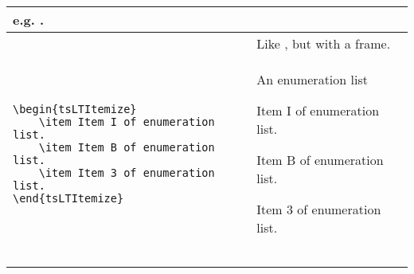 \begin{footnotesize}
\begin{longtable}{ | P{0.55\textwidth} | p{0.4\textwidth} | }
        e.g. .                                                                  \\
        \hline
         &
        Like , but with a frame.                                      \\
        \hline
        \begin{BVerbatim}
\begin{tsLTItemize}
    \item Item I of enumeration list.
    \item Item B of enumeration list.
    \item Item 3 of enumeration list.
\end{tsLTItemize}
        \end{BVerbatim}
        &
        An enumeration list
        \begin{tsLTItemize}
            \item Item I of enumeration list.
            \item Item B of enumeration list.
            \item Item 3 of enumeration list.
        \end{tsLTItemize}
        \\
        \hline
                                     &
                                                                                            \\
        \hline
                                   &
                                                                                          \\
        \hline
                                    &
                                                                                           \\
        \hline

\end{longtable}
\end{footnotesize}

